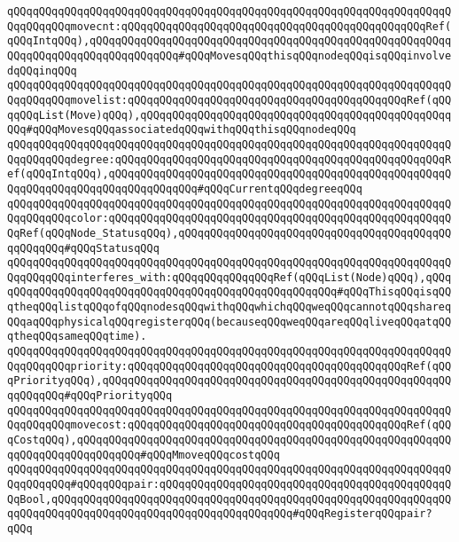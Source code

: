 \verb|qQQqqQQqqQQqqQQqqQQqqQQqqQQqqQQqqQQqqQQqqQQqqQQqqQQqqQQqqQQqqQQqqQQqqQQqqQQqqQQqmovecnt:qQQqqQQqqQQqqQQqqQQqqQQqqQQqqQQqqQQqqQQqqQQqqQQqRef(qQQqIntqQQq),qQQqqQQqqQQqqQQqqQQqqQQqqQQqqQQqqQQqqQQqqQQqqQQqqQQqqQQqqQQqqQQqqQQqqQQqqQQqqQQqqQQq#qQQqMovesqQQqthisqQQqnodeqQQqisqQQqinvolvedqQQqinqQQq|\newline
\verb|qQQqqQQqqQQqqQQqqQQqqQQqqQQqqQQqqQQqqQQqqQQqqQQqqQQqqQQqqQQqqQQqqQQqqQQqqQQqqQQqmovelist:qQQqqQQqqQQqqQQqqQQqqQQqqQQqqQQqqQQqqQQqqQQqRef(qQQqqQQqList(Move)qQQq),qQQqqQQqqQQqqQQqqQQqqQQqqQQqqQQqqQQqqQQqqQQqqQQqqQQq#qQQqMovesqQQqassociatedqQQqwithqQQqthisqQQqnodeqQQq|\newline
\verb|qQQqqQQqqQQqqQQqqQQqqQQqqQQqqQQqqQQqqQQqqQQqqQQqqQQqqQQqqQQqqQQqqQQqqQQqqQQqqQQqdegree:qQQqqQQqqQQqqQQqqQQqqQQqqQQqqQQqqQQqqQQqqQQqqQQqqQQqRef(qQQqIntqQQq),qQQqqQQqqQQqqQQqqQQqqQQqqQQqqQQqqQQqqQQqqQQqqQQqqQQqqQQqqQQqqQQqqQQqqQQqqQQqqQQqqQQq#qQQqCurrentqQQqdegreeqQQq|\newline
\verb|qQQqqQQqqQQqqQQqqQQqqQQqqQQqqQQqqQQqqQQqqQQqqQQqqQQqqQQqqQQqqQQqqQQqqQQqqQQqqQQqcolor:qQQqqQQqqQQqqQQqqQQqqQQqqQQqqQQqqQQqqQQqqQQqqQQqqQQqqQQqRef(qQQqNode_StatusqQQq),qQQqqQQqqQQqqQQqqQQqqQQqqQQqqQQqqQQqqQQqqQQqqQQqqQQq#qQQqStatusqQQq|\newline
\verb|qQQqqQQqqQQqqQQqqQQqqQQqqQQqqQQqqQQqqQQqqQQqqQQqqQQqqQQqqQQqqQQqqQQqqQQqqQQqqQQqinterferes_with:qQQqqQQqqQQqqQQqRef(qQQqList(Node)qQQq),qQQqqQQqqQQqqQQqqQQqqQQqqQQqqQQqqQQqqQQqqQQqqQQqqQQqqQQq#qQQqThisqQQqisqQQqtheqQQqlistqQQqofqQQqnodesqQQqwithqQQqwhichqQQqweqQQqcannotqQQqshareqQQqaqQQqphysicalqQQqregisterqQQq(becauseqQQqweqQQqareqQQqliveqQQqatqQQqtheqQQqsameqQQqtime).|\newline
\verb|qQQqqQQqqQQqqQQqqQQqqQQqqQQqqQQqqQQqqQQqqQQqqQQqqQQqqQQqqQQqqQQqqQQqqQQqqQQqqQQqpriority:qQQqqQQqqQQqqQQqqQQqqQQqqQQqqQQqqQQqqQQqqQQqRef(qQQqPriorityqQQq),qQQqqQQqqQQqqQQqqQQqqQQqqQQqqQQqqQQqqQQqqQQqqQQqqQQqqQQqqQQqqQQq#qQQqPriorityqQQq|\newline
\verb|qQQqqQQqqQQqqQQqqQQqqQQqqQQqqQQqqQQqqQQqqQQqqQQqqQQqqQQqqQQqqQQqqQQqqQQqqQQqqQQqmovecost:qQQqqQQqqQQqqQQqqQQqqQQqqQQqqQQqqQQqqQQqqQQqRef(qQQqCostqQQq),qQQqqQQqqQQqqQQqqQQqqQQqqQQqqQQqqQQqqQQqqQQqqQQqqQQqqQQqqQQqqQQqqQQqqQQqqQQqqQQq#qQQqMmoveqQQqcostqQQq|\newline
\verb|qQQqqQQqqQQqqQQqqQQqqQQqqQQqqQQqqQQqqQQqqQQqqQQqqQQqqQQqqQQqqQQqqQQqqQQqqQQqqQQq#qQQqqQQqpair:qQQqqQQqqQQqqQQqqQQqqQQqqQQqqQQqqQQqqQQqqQQqqQQqBool,qQQqqQQqqQQqqQQqqQQqqQQqqQQqqQQqqQQqqQQqqQQqqQQqqQQqqQQqqQQqqQQqqQQqqQQqqQQqqQQqqQQqqQQqqQQqqQQqqQQqqQQqqQQq#qQQqRegisterqQQqpair?qQQq|\newline

